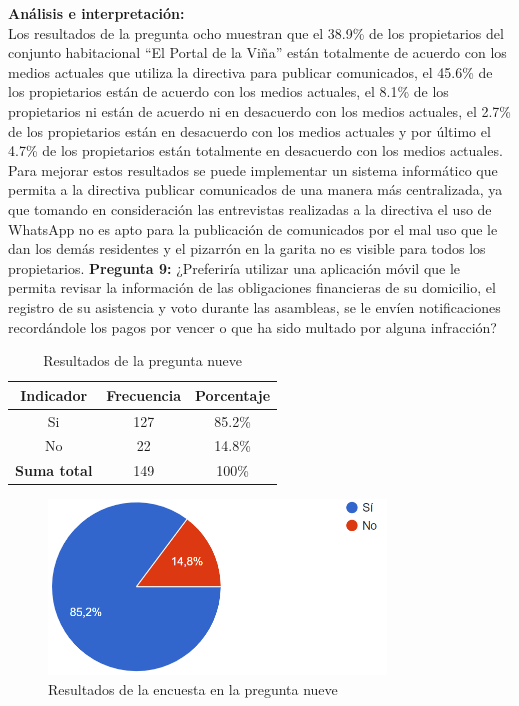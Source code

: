 \textbf{Análisis e interpretación:}\\
Los resultados de la pregunta ocho muestran que el 38.9\% de los propietarios del conjunto habitacional {\textquotedblleft}El Portal de la Viña{\textquotedblright} están totalmente de acuerdo con los medios actuales que utiliza la directiva para publicar comunicados, el 45.6\% de los propietarios están de acuerdo con los medios actuales, el 8.1\% de los propietarios ni están de acuerdo ni en desacuerdo con los medios actuales, el 2.7\% de los propietarios están en desacuerdo con los medios actuales y por último el 4.7\% de los propietarios están totalmente en desacuerdo con los medios actuales.
Para mejorar estos resultados se puede implementar un sistema informático que permita a la directiva publicar comunicados de una manera más centralizada, ya que tomando en consideración las entrevistas realizadas a la directiva el uso de WhatsApp no es apto para la publicación de comunicados por el mal uso que le dan los demás residentes y el pizarrón en la garita no es visible para todos los propietarios.
\bigbreak
\textbf{Pregunta 9:} ¿Preferiría utilizar una aplicación móvil que le permita revisar la información de las obligaciones financieras de su domicilio, el registro de su asistencia y voto durante las asambleas, se le envíen notificaciones recordándole los pagos por vencer o que ha sido multado por alguna infracción?
    \begin{table}[H]
        \centering
        \caption{Resultados de la pregunta nueve}
        \begin{tabular}{|c|c|c|}
            \hline
            \textbf{Indicador} & \textbf{Frecuencia} &  \textbf{Porcentaje} \\
            \hline
            Si & 127 & 85.2\% \\
            \hline
            No & 22 & 14.8\% \\
            \hline
            \textbf{Suma total} & 149 & 100\% \\
            \hline
        \end{tabular}\label{tab:table_preg_9}
    \end{table}
    \begin{figure}[H]
        \centering
        \includegraphics[width=0.8\textwidth]{resources/images/p9}
        \caption{Resultados de la encuesta en la pregunta nueve}\label{fig:figure_p9}
    \end{figure}

